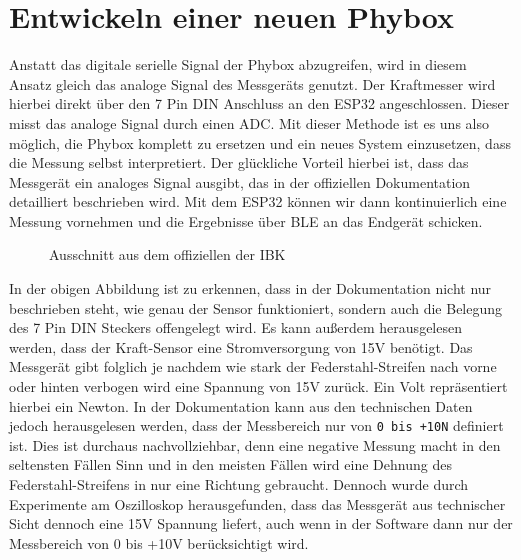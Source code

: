 \section{Entwickeln einer neuen Phybox}
\label{sec:Entwickeln einer neuen Phybox}

\begin{figure}[htb]
    \centering
\end{figure}

Anstatt das digitale serielle Signal der Phybox abzugreifen, wird in diesem Ansatz gleich das analoge Signal des Messgeräts genutzt. Der Kraftmesser wird hierbei direkt über den 7 Pin DIN Anschluss an den \ac{ESP32} angeschlossen. Dieser misst das analoge Signal durch einen \ac{ADC}. Mit dieser Methode ist es uns also möglich, die Phybox komplett zu ersetzen und ein neues System einzusetzen, dass die Messung selbst interpretiert. Der glückliche Vorteil hierbei ist, dass das Messgerät ein analoges Signal ausgibt, das in der offiziellen Dokumentation detailliert beschrieben wird. Mit dem \ac{ESP32} können wir dann kontinuierlich eine Messung vornehmen und die Ergebnisse über \ac{BLE} an das Endgerät schicken.

\clearpage

\begin{figure}[htb]
    \centering
    \caption{Ausschnitt aus dem offiziellen \cite{PhyboxDocumentation} der \ac{IBK}}
\end{figure}

In der obigen Abbildung ist zu erkennen, dass in der Dokumentation nicht nur beschrieben steht, wie genau der Sensor funktioniert, sondern auch die Belegung des 7 Pin DIN Steckers offengelegt wird. Es kann außerdem herausgelesen werden, dass der Kraft-Sensor eine Stromversorgung von \textpm 15V benötigt. Das Messgerät gibt folglich je nachdem wie stark der Federstahl-Streifen nach vorne oder hinten verbogen wird eine Spannung von \textpm 15V zurück. Ein Volt repräsentiert hierbei ein Newton. In der Dokumentation kann aus den technischen Daten jedoch herausgelesen werden, dass der Messbereich nur von \texttt{0 bis +10N} definiert ist. Dies ist durchaus nachvollziehbar, denn eine negative Messung macht in den seltensten Fällen Sinn und in den meisten Fällen wird eine Dehnung des Federstahl-Streifens in nur eine Richtung gebraucht. Dennoch wurde durch Experimente am Oszilloskop herausgefunden, dass das Messgerät aus technischer Sicht dennoch eine \textpm 15V Spannung liefert, auch wenn in der Software dann nur der Messbereich von 0 bis +10V berücksichtigt wird.

